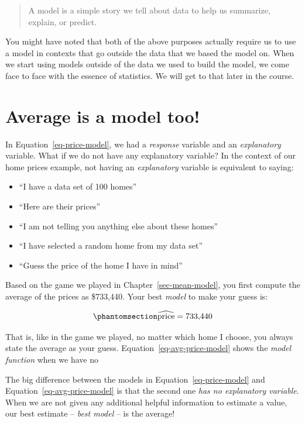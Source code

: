 \documentclass[
  12pt,
  letterpaper,
  DIV=11,
  numbers=noendperiod]{scrreprt}
\providecommand{\tightlist}{%
  \setlength{\itemsep}{0pt}\setlength{\parskip}{0pt}}
\begin{document}
\begin{quote}
A model is a simple story we tell about data to help us summarize,
explain, or predict.
\end{quote}

You might have noted that both of the above purposes actually require us
to use a model in contexts that go outside the data that we based the
model on. When we start using models outside of the data we used to
build the model, we come face to face with the essence of statistics. We
will get to that later in the course.

\section{Average is a model too!}\label{average-is-a-model-too}

In Equation~\ref{eq-price-model}, we had a \emph{response} variable and
an \emph{explanatory} variable. What if we do not have any explanatory
variable? In the context of our home prices example, not having an
\emph{explanatory} variable is equivalent to saying:

\begin{itemize}
\tightlist
\item
  ``I have a data set of 100 homes''
\item
  ``Here are their prices''
\item
  ``I am not telling you anything else about these homes''
\item
  ``I have selected a random home from my data set''
\item
  ``Guess the price of the home I have in mind''
\end{itemize}

Based on the game we played in Chapter~\ref{sec-mean-model}, you first
compute the average of the prices as \$733,440. Your best \emph{model}
to make your guess is:

\begin{equation}\phantomsection\label{eq-avg-price-model}{
\widehat{\text{price}} = 733{,}440
}\end{equation}

That is, like in the game we played, no matter which home I choose, you
always state the average as your guess.
Equation~\ref{eq-avg-price-model} shows the \emph{model function} when
we have no

The big difference between the models in Equation~\ref{eq-price-model}
and Equation~\ref{eq-avg-price-model} is that the second one \emph{has
no explanatory variable}. When we are not given any additional helpful
information to estimate a value, our best estimate -- \emph{best model}
-- is the average!
\end{document}
